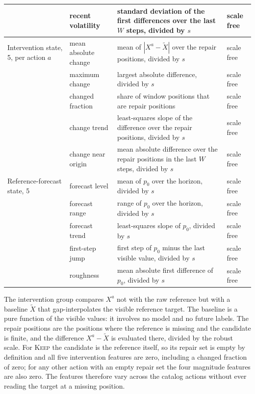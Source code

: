 \documentclass{article}
\begin{document}
\begin{table}[htbp]
{\begin{tabular}{@{}l p{} p{} p{}@{}}
     & recent volatility & standard deviation of the first differences over the last $W$ steps, divided by $s$ & scale free \\
    \midrule
    Intervention state, 5, per action $a$ & mean absolute change & mean of $|X^{a} - \tilde{X}|$ over the repair positions, divided by $s$ & scale free \\
     & maximum change & largest absolute difference, divided by $s$ & scale free \\
     & changed fraction & share of window positions that are repair positions & scale free \\
     & change trend & least-squares slope of the difference over the repair positions, divided by $s$ & scale free \\
     & change near origin & mean absolute difference over the repair positions in the last $W$ steps, divided by $s$ & scale free \\
    \midrule
    Reference-forecast state, 5 & forecast level & mean of $p_0$ over the horizon, divided by $s$ & scale free \\
     & forecast range & range of $p_0$ over the horizon, divided by $s$ & scale free \\
     & forecast trend & least-squares slope of $p_0$, divided by $s$ & scale free \\
     & first-step jump & first step of $p_0$ minus the last visible value, divided by $s$ & scale free \\
     & roughness & mean absolute first difference of $p_0$, divided by $s$ & scale free \\
    \bottomrule
  \end{tabular}}
\end{table}

The intervention group compares $X^{a}$ not with the raw reference but with a baseline
$\tilde{X}$ that gap-interpolates the visible reference target. The baseline is a pure
function of the visible values: it involves no model and no future labels. The repair
positions are the positions where the reference is missing and the candidate is finite, and
the difference $X^{a} - \tilde{X}$ is evaluated there, divided by the robust scale. For
\textsc{Keep} the candidate is the reference itself, so its repair set is empty by
definition and all five intervention features are zero, including a changed fraction of
zero; for any other action with an empty repair set the four magnitude features are also
zero. The features therefore vary across the catalog actions without ever reading the
target at a missing position.
\end{document}
